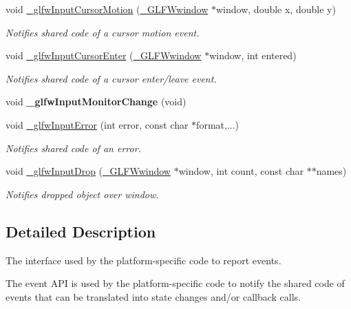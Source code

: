 \begin{DoxyCompactItemize}
void \hyperlink{group__event_ga575ff8f404c880e4e9b5cbb6a22721ec}{\+\_\+glfw\+Input\+Cursor\+Motion} (\hyperlink{struct__GLFWwindow}{\+\_\+\+G\+L\+F\+Wwindow} $\ast$window, double x, double y)
\begin{DoxyCompactList}\small\item\em Notifies shared code of a cursor motion event. \end{DoxyCompactList}\item 
void \hyperlink{group__event_ga6b99bfcd8a804aa34030aaecc62fc53e}{\+\_\+glfw\+Input\+Cursor\+Enter} (\hyperlink{struct__GLFWwindow}{\+\_\+\+G\+L\+F\+Wwindow} $\ast$window, int entered)
\begin{DoxyCompactList}\small\item\em Notifies shared code of a cursor enter/leave event. \end{DoxyCompactList}\item 
\hypertarget{group__event_gac9fc45af5a573e5c674cad81d29795bb}{}void {\bfseries \+\_\+glfw\+Input\+Monitor\+Change} (void)\label{group__event_gac9fc45af5a573e5c674cad81d29795bb}

\item 
void \hyperlink{group__event_ga7761b521bf21d6fb026b0ca9d6f52064}{\+\_\+glfw\+Input\+Error} (int error, const char $\ast$format,...)
\begin{DoxyCompactList}\small\item\em Notifies shared code of an error. \end{DoxyCompactList}\item 
void \hyperlink{group__event_ga9d1981c068c3c0dca14de21ecba1c66c}{\+\_\+glfw\+Input\+Drop} (\hyperlink{struct__GLFWwindow}{\+\_\+\+G\+L\+F\+Wwindow} $\ast$window, int count, const char $\ast$$\ast$names)
\begin{DoxyCompactList}\small\item\em Notifies dropped object over window. \end{DoxyCompactList}\end{DoxyCompactItemize}


\subsection{Detailed Description}
The interface used by the platform-\/specific code to report events. 

The event A\+P\+I is used by the platform-\/specific code to notify the shared code of events that can be translated into state changes and/or callback calls. 

